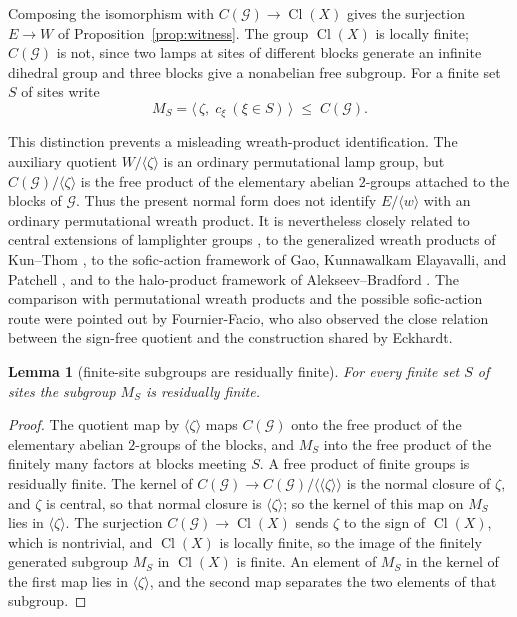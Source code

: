 \documentclass[11pt]{amsart}
\newcommand{\leanverified}[2]{\ignorespaces}
\newtheorem{lemma}[theorem]{Lemma}
\theoremstyle{definition}
\theoremstyle{remark}
\theoremstyle{plain}
\newcommand{\Cl}{\operatorname{Cl}}
\begin{document}
Composing the isomorphism with $C(\mathcal G)\to\Cl(X)$ gives the
surjection $E\to W$ of Proposition~\ref{prop:witness}.  The group
$\Cl(X)$ is locally finite; $C(\mathcal G)$ is not, since two lamps at
sites of different blocks generate an infinite dihedral group and three
blocks give a nonabelian free subgroup.  For a finite set $S$ of sites
write
\[
 M_S=\bigl\langle\,\zeta,\;c_\xi\ (\xi\in S)\,\bigr\rangle
 \;\le\;C(\mathcal G).
\]

This distinction prevents a misleading wreath-product identification.
The auxiliary quotient $W/\langle\zeta\rangle$ is an ordinary
permutational lamp group, but
$C(\mathcal G)/\langle\zeta\rangle$ is the free product of the elementary
abelian $2$-groups attached to the blocks of $\mathcal G$.  Thus the present
normal form does not identify $E/\langle w\rangle$ with an ordinary
permutational wreath product.  It is nevertheless closely related to
central extensions of lamplighter groups \cite{FFG23,Bodart25}, to the
generalized wreath products of Kun--Thom \cite{KT}, to the sofic-action
framework of Gao, Kunnawalkam Elayavalli, and Patchell \cite{GKEP}, and
to the halo-product framework of Alekseev--Bradford
\cite{AlekseevBradford}.
The comparison with permutational wreath products and the possible
sofic-action route were pointed out by Fournier-Facio, who also observed the
close relation between the sign-free quotient and the construction shared by
Eckhardt.

\begin{lemma}[finite-site subgroups are residually finite]\label{lem:window}
For every finite set $S$ of sites the subgroup $M_S$ is residually
finite.
\leanverified{Sofic/BlockCliffordTowerSofic}{GroupApproximation.BlockCliffordTowerSofic.manuscriptResiduallyFiniteWindow}
\leanverified{Sofic/LiteralSoficAssembly}{GroupApproximation.LiteralSoficAssembly.lampEquiv}
\end{lemma}

\begin{proof}
The quotient map by $\langle\zeta\rangle$ maps $C(\mathcal G)$ onto
the free product of the elementary abelian $2$-groups of the blocks,
and $M_S$ into the free product of the finitely many factors at blocks
meeting $S$.  A free
product of finite groups is residually finite.  The kernel of
$C(\mathcal G)\to C(\mathcal G)/\langle\!\langle\zeta\rangle\!\rangle$ is
the normal closure of $\zeta$, and $\zeta$ is central, so that normal
closure is $\langle\zeta\rangle$; so the kernel of this map on $M_S$
lies in $\langle\zeta\rangle$.  The surjection
$C(\mathcal G)\to\Cl(X)$ sends $\zeta$ to the sign of $\Cl(X)$, which
is nontrivial, and $\Cl(X)$ is locally finite, so the image of the
finitely generated subgroup $M_S$ in $\Cl(X)$ is finite.  An element of $M_S$
in the kernel of the first map lies in $\langle\zeta\rangle$, and the
second map separates the two elements of that subgroup.
\end{proof}
\end{document}
